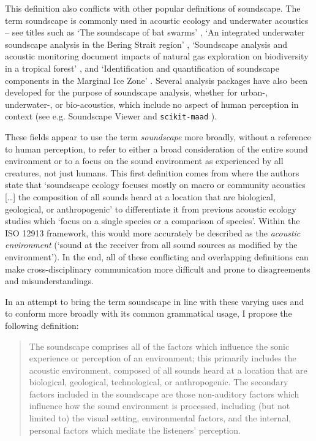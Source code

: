 This definition also conflicts with other popular definitions of soundscape. The term soundscape is commonly used in acoustic ecology and underwater acoustics -- see titles such as `The soundscape of bat swarms' \citep{Kloepper2017soundscape}, `An integrated underwater soundscape analysis in the Bering Strait region' \citep{McKenna2021integrated}, `Soundscape analysis and acoustic monitoring document impacts of natural gas exploration on biodiversity in a tropical forest' \citep{Deichmann2017Soundscape}, and `Identification and quantification of soundscape components in the Marginal Ice Zone' \citep{Geyer2016Identification}. Several analysis packages have also been developed for the purpose of soundscape analysis, whether for urban-, underwater-, or bio-acoustics, which include no aspect of human perception in context (see e.g. Soundscape Viewer \citep{Sun2020Soundscape} and \texttt{scikit-maad} \citep{Ulloa2021scikit}). 

These fields appear to use the term \emph{soundscape} more broadly, without a reference to human perception, to refer to either a broad consideration of the entire sound environment or to a focus on the sound environment as experienced by all creatures, not just humans. This first definition comes from \citet{Pijanowski2011Soundscape} where the authors state that `soundscape ecology focuses mostly on macro or community acoustics [\dots] the composition of all sounds heard at a location that are biological, geological, or anthropogenic' to differentiate it from previous acoustic ecology studies which `focus on a single species or a comparison of species'. Within the ISO 12913 framework, this would more accurately be described as the \emph{acoustic environment} (`sound at the receiver from all sound sources as modified by the environment'). In the end, all of these conflicting and overlapping definitions can make cross-disciplinary communication more difficult and prone to disagreements and misunderstandings. 

In an attempt to bring the term soundscape in line with these varying uses and to conform more broadly with its common grammatical usage, I propose the following definition:

\begin{quote}
The soundscape comprises all of the factors which influence the sonic experience or perception of an environment; this primarily includes the acoustic environment, composed of all sounds heard at a location that are biological, geological, technological, or anthropogenic. The secondary factors included in the soundscape are those non-auditory factors which influence how the sound environment is processed, including (but not limited to) the visual setting, environmental factors, and the internal, personal factors 
which mediate the listeners' perception.
\end{quote}

